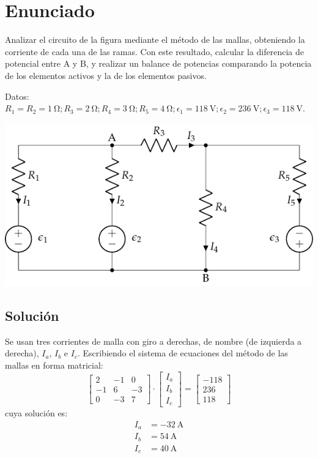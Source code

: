 \section{Enunciado}
Analizar el circuito de la figura mediante el método de las mallas,
obteniendo la corriente de cada una de las ramas. Con este resultado,
calcular la diferencia de potencial entre A y B, y realizar un balance
de potencias comparando la potencia de los elementos activos y la de
los elementos pasivos.

Datos:
$R_1 = R_2 = \qty{1}{\ohm}; R_3 = \qty{2}{\ohm}; R_4 = \qty{3}{\ohm};
R_5=\qty{4}{\ohm}; \epsilon_1=\qty{118}{\volt}; \epsilon_2 =
\qty{236}{\volt}; \epsilon_3 = \qty{118}{\volt}$.

\begin{center}
  \includegraphics{figuras/mallas2.pdf}
\end{center}

\subsection*{Solución}
Se usan tres corrientes de malla con giro a derechas, de nombre (de
izquierda a derecha), $I_a$, $I_b$ e $I_c$. Escribiendo el sistema de
ecuaciones del método de las mallas en forma matricial:
\begin{equation*}
  \begin{bmatrix}
    2 & -1 & 0 \\
    -1 & 6 & -3 \\
    0 & -3 & 7
  \end{bmatrix}
  \cdot
  \begin{bmatrix}
    I_a\\
    I_b\\
    I_c
  \end{bmatrix}
  =
  \begin{bmatrix}
    -118\\
    236\\
    118
  \end{bmatrix}
\end{equation*}
cuya solución es:
\begin{align*}
  I_a &= \qty{-32}{\ampere}\\
  I_b &= \qty{54}{\ampere}\\
  I_c &= \qty{40}{\ampere}
\end{align*}

